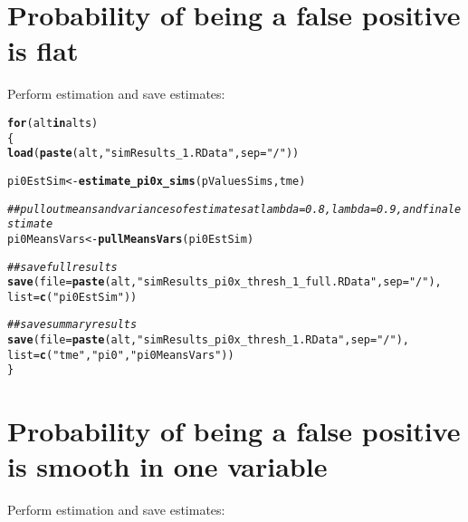 \documentclass{article}\usepackage[]{graphicx}\usepackage[]{color}
\makeatletter
\newcommand{\hlstr}[1]{\textcolor[rgb]{0.192,0.494,0.8}{#1}}%
\newcommand{\hlcom}[1]{\textcolor[rgb]{0.678,0.584,0.686}{\textit{#1}}}%
\newcommand{\hlstd}[1]{\textcolor[rgb]{0.345,0.345,0.345}{#1}}%
\newcommand{\hlkwa}[1]{\textcolor[rgb]{0.161,0.373,0.58}{\textbf{#1}}}%
\newcommand{\hlkwb}[1]{\textcolor[rgb]{0.69,0.353,0.396}{#1}}%
\newcommand{\hlkwc}[1]{\textcolor[rgb]{0.333,0.667,0.333}{#1}}%
\newcommand{\hlkwd}[1]{\textcolor[rgb]{0.737,0.353,0.396}{\textbf{#1}}}%
\newenvironment{kframe}{%
 \def\at@end@of@kframe{}%
 \ifinner\ifhmode%
  \def\at@end@of@kframe{\end{minipage}}%
  \begin{minipage}{\columnwidth}%
 \fi\fi%
 \def\FrameCommand##1{\hskip\@totalleftmargin \hskip-\fboxsep
 \colorbox{shadecolor}{##1}\hskip-\fboxsep
     \hskip-\linewidth \hskip-\@totalleftmargin \hskip\columnwidth}%
 \MakeFramed {\advance\hsize-\width
   \@totalleftmargin\z@ \linewidth\hsize
   \@setminipage}}%
 {\par\unskip\endMakeFramed%
 \at@end@of@kframe}
\newenvironment{knitrout}{}{} %
\makeatother
\begin{document}
\section{Probability of being a false positive is flat}

Perform estimation and save estimates:

\begin{knitrout}
\color{fgcolor}\begin{kframe}
\begin{alltt}
\hlkwa{for}\hlstd{(alt} \hlkwa{in} \hlstd{alts)}
\hlstd{\{}
  \hlkwd{load}\hlstd{(}\hlkwd{paste}\hlstd{(alt,}\hlstr{"simResults_1.RData"}\hlstd{,}\hlkwc{sep}\hlstd{=}\hlstr{"/"}\hlstd{))}

  \hlstd{pi0EstSim} \hlkwb{<-} \hlkwd{estimate_pi0x_sims}\hlstd{(pValuesSims, tme)}

  \hlcom{##pull out means and variances of estimates at lambda=0.8, lambda=0.9, and final estimate}
  \hlstd{pi0MeansVars} \hlkwb{<-} \hlkwd{pullMeansVars}\hlstd{(pi0EstSim)}

  \hlcom{##save full results}
  \hlkwd{save}\hlstd{(}\hlkwc{file}\hlstd{=}\hlkwd{paste}\hlstd{(alt,}\hlstr{"simResults_pi0x_thresh_1_full.RData"}\hlstd{,}\hlkwc{sep}\hlstd{=}\hlstr{"/"}\hlstd{),}
       \hlkwc{list}\hlstd{=}\hlkwd{c}\hlstd{(}\hlstr{"pi0EstSim"}\hlstd{))}

  \hlcom{##save summary results}
  \hlkwd{save}\hlstd{(}\hlkwc{file}\hlstd{=}\hlkwd{paste}\hlstd{(alt,}\hlstr{"simResults_pi0x_thresh_1.RData"}\hlstd{,}\hlkwc{sep}\hlstd{=}\hlstr{"/"}\hlstd{),}
       \hlkwc{list}\hlstd{=}\hlkwd{c}\hlstd{(}\hlstr{"tme"}\hlstd{,} \hlstr{"pi0"}\hlstd{,} \hlstr{"pi0MeansVars"}\hlstd{))}
\hlstd{\}}
\end{alltt}
\end{kframe}
\end{knitrout}

\section{Probability of being a false positive is smooth in one variable}

Perform estimation and save estimates:
\end{document}
